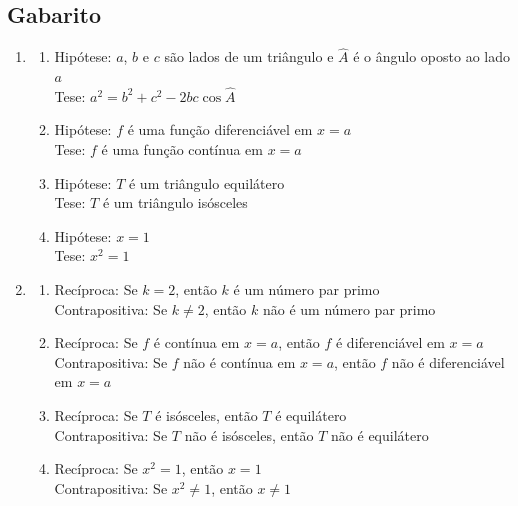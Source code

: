 \subsection{Gabarito}

\begin{enumerate}
    \item
    \begin{enumerate}
        \item Hipótese: $a$, $b$ e $c$ são lados de um triângulo e $\hat{A}$
          é o ângulo oposto ao lado $a$ \\
          Tese: $a^2 = b^2 + c^2 - 2bc \cos \hat{A}$

        \item Hipótese: $f$ é uma função diferenciável em $x=a$ \\
          Tese: $f$ é uma função contínua em $x=a$

        \item Hipótese: $T$ é um triângulo equilátero \\
          Tese: $T$ é um triângulo isósceles

        \item Hipótese: $x=1$ \\
          Tese: $x^2=1$
    \end{enumerate}

    \item
    \begin{enumerate}
        \item Recíproca: Se $k=2$, então $k$ é um número par primo \\
          Contrapositiva: Se $k \neq 2$, então $k$ não é um número par primo

        \item Recíproca: Se $f$ é contínua em $x=a$,
          então $f$ é diferenciável em $x=a$ \\
          Contrapositiva: Se $f$ não é contínua em $x=a$,
          então $f$ não é diferenciável em $x=a$

        \item Recíproca: Se $T$ é isósceles, então $T$ é equilátero \\
          Contrapositiva: Se $T$ não é isósceles, então $T$ não é equilátero

        \item Recíproca: Se $x^2=1$, então $x=1$ \\
          Contrapositiva: Se $x^2 \neq 1$, então $x \neq 1$
    \end{enumerate}


\end{enumerate}
